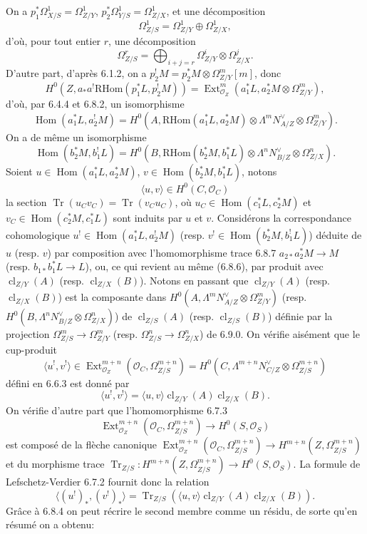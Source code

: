 \documentclass[11pt]{article}
\DeclareMathOperator{\Hom}{Hom}
\DeclareMathOperator{\Ext}{Ext}
\providecommand{\RHom}{\mathrm{RHom}}
\providecommand{\cl}{\operatorname{cl}}
\providecommand{\OO}{\mathcal{O}}
\providecommand{\RHom}{\mathrm{RHom}}
\providecommand{\Hom}{\operatorname{Hom}}
\providecommand{\RHom}{\mathrm R\mathcal{H}om}
\providecommand{\cl}{\operatorname{cl}}
\providecommand{\RHom}{\mathrm{RHom}}
\providecommand{\Hom}{\operatorname{Hom}}
\providecommand{\cl}{\operatorname{cl}}
\begin{document}
On a $p_1^*\Omega^1_{X/S}=\Omega^1_{Z/Y}$, $p_2^*\Omega^1_{Y/S}=\Omega^1_{Z/X}$, et une décomposition
\[
\Omega^1_{Z/S}=\Omega^1_{Z/Y}\oplus\Omega^1_{Z/X},
\]
d'où, pour tout entier $r$, une décomposition
\begin{equation}
\tag{6.9.0}
\Omega^r_{Z/S}=\bigoplus_{i+j=r}\Omega^i_{Z/Y}\otimes\Omega^j_{Z/X}.
\end{equation}
D'autre part, d'après 6.1.2, on a $p_2^!M=p_2^*M\otimes\Omega^m_{Z/Y}[m]$, donc
\[
H^0(Z,a_*a^!\RHom(p_1^*L,p_2^!M))=\Ext^m_{\OO_Z}(a_1^*L,a_2^*M\otimes\Omega^m_{Z/Y}),
\]
d'où, par 6.4.4 et 6.8.2, un isomorphisme
\begin{equation}
\tag{6.9.1}
\Hom(a_1^*L,a_2^!M)=H^0(A,\RHom(a_1^*L,a_2^*M)\otimes\Lambda^m N_{A/Z}^{\vee}\otimes\Omega^m_{Z/Y}).
\end{equation}
On a de même un isomorphisme
\begin{equation}
\tag{6.9.2}
\Hom(b_2^*M,b_1^!L)=H^0(B,\RHom(b_2^*M,b_1^*L)\otimes\Lambda^n N_{B/Z}^{\vee}\otimes\Omega^n_{Z/X}).
\end{equation}
Soient $u\in\Hom(a_1^*L,a_2^*M)$, $v\in\Hom(b_2^*M,b_1^*L)$, notons
\begin{equation}
\tag{6.9.3}
\langle u,v\rangle\in H^0(C,\OO_C)
\end{equation}
la section $\operatorname{Tr}(u_Cv_C)=\operatorname{Tr}(v_Cu_C)$, où $u_C\in\Hom(c_1^*L,c_2^*M)$ et $v_C\in\Hom(c_2^*M,c_1^*L)$ sont induits par $u$ et $v$. Considérons la correspondance cohomologique $u^!\in\Hom(a_1^*L,a_2^!M)$ (resp. $v^!\in\Hom(b_2^*M,b_1^!L)$) déduite de $u$ (resp. $v$) par composition avec l'homomorphisme trace 6.8.7 $a_{2*}a_2^*M\to M$ (resp. $b_{1*}b_1^*L\to L$), ou, ce qui revient au même (6.8.6), par produit avec $\cl_{Z/Y}(A)$ (resp. $\cl_{Z/X}(B)$). Notons en passant que $\cl_{Z/Y}(A)$ (resp. $\cl_{Z/X}(B)$) est la composante dans $H^0(A,\Lambda^mN_{A/Z}^{\vee}\otimes\Omega^m_{Z/Y})$ (resp. $H^0(B,\Lambda^nN_{B/Z}^{\vee}\otimes\Omega^n_{Z/X})$) de $\cl_{Z/S}(A)$ (resp. $\cl_{Z/S}(B)$) définie par la projection $\Omega^m_{Z/S}\to\Omega^m_{Z/Y}$ (resp. $\Omega^n_{Z/S}\to\Omega^n_{Z/X}$) de 6.9.0. On vérifie aisément que le cup-produit
\[
\langle u^!,v^!\rangle\in\Ext^{m+n}_{\OO_Z}(\OO_C,\Omega^{m+n}_{Z/S})=H^0(C,\Lambda^{m+n}N_{C/Z}^{\vee}\otimes\Omega^{m+n}_{Z/S})
\]
défini en 6.6.3 est donné par
\begin{equation}
\tag{6.9.4}
\langle u^!,v^!\rangle=\langle u,v\rangle\cl_{Z/Y}(A)\cl_{Z/X}(B).
\end{equation}
On vérifie d'autre part que l'homomorphisme 6.7.3
\[
\Ext^{m+n}_{\OO_Z}(\OO_C,\Omega^{m+n}_{Z/S})\longrightarrow H^0(S,\OO_S)
\]
est composé de la flèche canonique $\Ext^{m+n}_{\OO_Z}(\OO_C,\Omega^{m+n}_{Z/S})\to H^{m+n}(Z,\Omega^{m+n}_{Z/S})$ et du morphisme trace $\operatorname{Tr}_{Z/S}:H^{m+n}(Z,\Omega^{m+n}_{Z/S})\to H^0(S,\OO_S)$. La formule de Lefschetz-Verdier 6.7.2 fournit donc la relation
\begin{equation}
\tag{6.9.5}
\langle (u^!)_*,(v^!)_*\rangle=\operatorname{Tr}_{Z/S}(\langle u,v\rangle\cl_{Z/Y}(A)\cl_{Z/X}(B)).
\end{equation}
Grâce à 6.8.4 on peut récrire le second membre comme un résidu, de sorte qu'en résumé on a obtenu:
\end{document}
